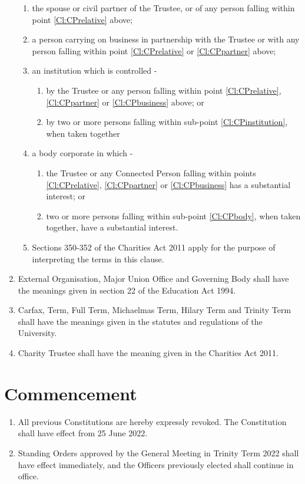 \documentclass[11pt,a4paper, oneside]{memoir}
\begin{document}
\begin{enumerate}
\begin{enumerate}
			\item \label{Cl:CPpartner} the spouse or civil partner of the Trustee, or of any person falling within point \ref{Cl:CPrelative} above;
			\item \label{Cl:CPbusiness} a person carrying on business in partnership with the Trustee or with any person falling within point \ref{Cl:CPrelative} or \ref{Cl:CPpartner} above;
			\item an institution which is controlled -
			\begin{enumerate}
				\item \label{Cl:CPinstitution} by the Trustee or any person falling within point \ref{Cl:CPrelative}, \ref{Cl:CPpartner} or \ref{Cl:CPbusiness} above; or
				\item by two or more persons falling within sub-point \ref{Cl:CPinstitution}, when taken together
			\end{enumerate}
			\item a body corporate in which -
			\begin{enumerate}
				\item \label{Cl:CPbody} the Trustee or any Connected Person falling within points \ref{Cl:CPrelative}, \ref{Cl:CPpartner} or \ref{Cl:CPbusiness}  has a substantial interest; or
				\item two or more persons falling within sub-point \ref{Cl:CPbody}, when taken together, have a substantial interest.
			\end{enumerate}
			\item Sections 350-352 of the Charities Act 2011 apply for the purpose of interpreting the terms in this clause.
		\end{enumerate}
		\item External Organisation, Major Union Office and Governing Body shall have the meanings given in section 22 of the Education Act 1994.
		\item Carfax, Term, Full Term, Michaelmas Term, Hilary Term and Trinity Term shall have the meanings given in the statutes and regulations of the University.
		\item Charity Trustee shall have the meaning given in the Charities Act 2011.
	\end{enumerate}
	\section{Commencement}
	\begin{enumerate}
		\item All previous Constitutions are hereby expressly revoked.  The Constitution shall have effect from 25 June 2022.
		\item Standing Orders approved by the General Meeting in Trinity Term 2022 shall have effect immediately, and the Officers previously elected shall continue in office.
	\end{enumerate}
\end{document}
